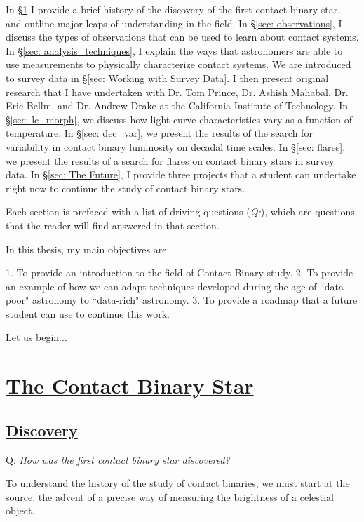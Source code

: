\documentclass[12pt]{article} %
\numberwithin{equation}{section} %
\begin{document}
In \S \ref{sec: background} I provide a brief history of the discovery of the first contact binary star, and outline major leaps of understanding in the field. In \S\ref{sec: observations}, I discuss the types of observations that can be used to learn about contact systems. In \S\ref{sec: analysis_techniques}, I explain the ways that astronomers are able to use measurements to physically characterize contact systems. We are introduced to survey data in \S\ref{sec: Working with Survey Data}. I then present original research that I have undertaken with Dr. Tom Prince, Dr. Ashish Mahabal, Dr. Eric Bellm, and Dr. Andrew Drake at the California Institute of Technology. In \S \ref{sec: lc_morph}, we discuss how light-curve characteristics vary as a function of temperature. In \S \ref{sec: dec_var}, we present the results of the search for variability in contact binary luminosity on decadal time scales. In \S \ref{sec: flares}, we present the results of a search for flares on contact binary stars in survey data. In \S\ref{sec: The Future}, I provide three projects that a student can undertake right now to continue the study of contact binary stars.

Each section is prefaced with a list of driving questions (\emph{Q:}), which are questions that the reader will find answered in that section.

In this thesis, my main objectives are:

1. To provide an introduction to the field of Contact Binary study.
2. To provide an example of how we can adapt techniques developed during the age of ``data-poor" astronomy to ``data-rich" astronomy.
3. To provide a roadmap that a future student can use to continue this work.

Let us begin...

\section[The Contact Binary Star]{\hyperlink{toc}{The Contact Binary Star}} \label{sec: background}

\subsection[\emph{Discovery}]{\hyperlink{toc}{Discovery}}

Q: \emph{How was the first contact binary star discovered?}

To understand the history of the study of contact binaries, we must start at the source: the advent of a precise way of measuring the brightness of a celestial object.  
\end{document}
